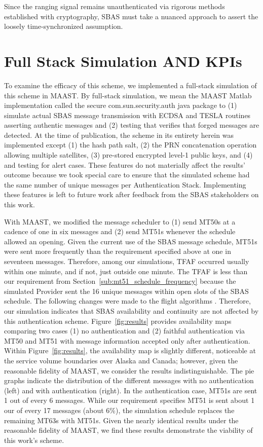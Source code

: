 \documentclass[APA,STIX1COL]{IONjournal/ION-APA Template}
\begin{document}
	Since the ranging signal remains unauthenticated via rigorous methods established with cryptography, SBAS must take a nuanced approach to assert the loosely time-synchronized assumption.

\section{Full Stack Simulation AND KPIs} \label{sec:full_stack_simulation}

	To examine the efficacy of this scheme, we implemented a full-stack simulation of this scheme in MAAST.
	By full-stack simulation, we mean the MAAST Matlab implementation called the secure com.sun.security.auth java package to (1) simulate actual SBAS message transmission with ECDSA and TESLA routines asserting authentic messages and (2) testing that verifies that forged messages are detected.
	At the time of publication, the scheme in its entirety herein was implemented except (1) the hash path salt, (2) the PRN concatenation operation allowing multiple satellites, (3) pre-stored encrypted level-1 public keys, and (4) and testing for alert cases.
	These features do not materially affect the results' outcome because we took special care to ensure that the simulated scheme had the same number of unique messages per Authentication Stack.
	Implementing these features is left to future work after feedback from the SBAS stakeholders on this work.

	With MAAST, we modified the message scheduler to (1) send MT50s at a cadence of one in six messages and (2) send MT51s whenever the schedule allowed an opening.
	Given the current use of the SBAS message schedule, MT51s were sent more frequently than the requirement specified above at one in seventeen messages.
	Therefore, among our simulations, TFAF occurred usually within one minute, and if not, just outside one minute.
	The TFAF is less than our requirement from Section~\ref{sub:mt51_schedule_frequency} because the simulated Provider sent the 16 unique messages within open slots of the SBAS schedule.
	The following changes were made to the flight algorithms \cite{}.
	Therefore, our simulation indicates that SBAS availability and continuity are not affected by this authentication scheme.
	Figure~\ref{fig:results} provides availability maps comparing two cases (1) no authentication and (2) faithful authentication via MT50 and MT51 with message information accepted only after authentication.
	Within Figure~\ref{fig:results}, the availability map is slightly different, noticeable at the service volume boundaries over Alaska and Canada; however, given the reasonable fidelity of MAAST, we consider the results indistinguishable.
	The pie graphs indicate the distribution of the different messages with no authentication (left) and with authentication (right).
	In the authentication case, MT51s are sent 1 out of every 6 messages.
	While our requirement specifies MT51 is sent about 1 our of every 17 messages (about 6\%), the simulation schedule replaces the remaining MT63s with MT51s.
	Given the nearly identical results under the reasonable fidelity of MAAST, we find these results demonstrate the viability of this work's scheme.
\end{document}
